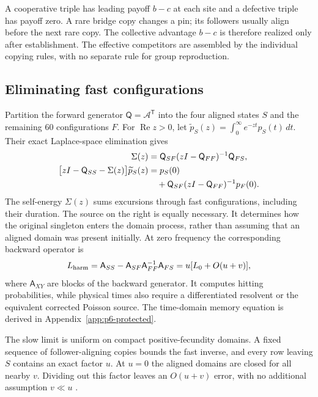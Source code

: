 \documentclass[aps,pre,reprint,amsmath,amssymb,longbibliography]{revtex4-2}
\newcommand{\T}{\mathsf T}
\begin{document}
A cooperative triple has leading payoff $b-c$ at each site and a
defective triple has payoff zero. A rare bridge copy changes a pin;
its followers usually align before the next rare copy. The collective advantage $b-c$ is therefore realized only after
establishment. The effective competitors are assembled by the
individual copying rules, with no separate rule for group reproduction.

\subsection{Eliminating fast configurations}
\label{sec:effective-memory}
Partition the forward generator $\mathsf Q=\mathcal A^{\T}$ into
the four aligned states $S$ and the remaining 60 configurations $F$.
For $\operatorname{Re}z>0$, let
$\widetilde p_S(z)=\int_0^\infty e^{-zt}p_S(t)\,dt$.
Their exact Laplace-space elimination gives
\begin{align}
 \Sigma(z)&=\mathsf Q_{SF}(zI-\mathsf Q_{FF})^{-1}
                    \mathsf Q_{FS},\notag\\
 \bigl[zI-\mathsf Q_{SS}-\Sigma(z)\bigr]\widetilde p_S(z)
 & =p_S(0) \label{eq:main-self-energy}\\
 &\quad+\mathsf Q_{SF}(zI-\mathsf Q_{FF})^{-1}p_F(0). \notag
\end{align}
The self-energy $\Sigma(z)$ sums excursions through fast configurations,
including their duration. The source on the right is equally necessary.
It determines how the original singleton enters the domain process,
rather than assuming that an aligned domain was present initially. At zero frequency the corresponding backward operator is
\begin{equation}
 L_{\rm harm}
 =\mathsf A_{SS}-\mathsf A_{SF}\mathsf A_{FF}^{-1}\mathsf A_{FS}
 =u[L_0+O(u+v)] ,
 \label{eq:schur}
\end{equation}
where $\mathsf A_{XY}$ are blocks of the backward generator. It computes hitting
probabilities, while physical times also require a differentiated
resolvent or the equivalent corrected Poisson source. The time-domain
memory equation is derived in Appendix~\ref{app:p6-protected}.

The slow limit is uniform on compact positive-fecundity domains. A fixed
sequence of follower-aligning copies bounds the fast inverse, and every
row leaving $S$ contains an exact factor $u$.  At $u=0$ the aligned
domains are closed for all nearby $v$. Dividing out this factor leaves
an $O(u+v)$ error, with no additional assumption $v\ll u$
\cite{SlowAvrachenkovHaviv2004}.
\end{document}
